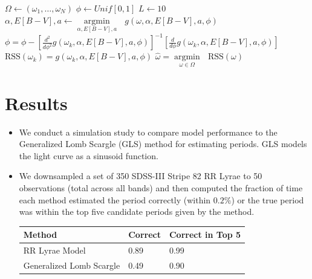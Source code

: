 \documentclass[a0,portrait]{a0poster}
\newcommand{\argmin}[1]{\underset{#1}{\operatorname{argmin}}\text{ }}
\begin{document}
\begin{multicols}{2}
\begin{itemize}
\begin{algorithmic}[1]
  \State $\Omega \gets (\omega_1,\ldots,\omega_N)$ 
  \State $\phi \gets Unif[0,1]$ 
  \State $L \gets 10$ 
  \State $\alpha,E[B-V],a \gets \argmin{\alpha,E[B-V],a} g(\omega,\alpha,E[B-V],a,\phi)$  
  \State $\phi = \phi - \left[\frac{d^2}{d\phi^2}g(\omega_k,\alpha,E[B-V],a,\phi)\right]^{-1}\left[\frac{d}{d\phi}g(\omega_k,\alpha,E[B-V],a,\phi)\right] $ 
  \EndFor
  \State $\text{RSS}(\omega_k) = g(\omega_k,\alpha,E[B-V],a,\phi)$
  \EndFor
  \State $\widehat{\omega} = \argmin{\omega \in \Omega} \text{RSS}(\omega)$
\end{algorithmic}

\end{itemize}


\section*{Results}

\begin{itemize}

\item We conduct a simulation study to compare model performance to the Generalized Lomb Scargle (GLS) method for estimating periods. GLS models the light curve as a sinusoid function.

\item We downsampled a set of 350 SDSS-III Stripe 82 RR Lyrae to 50 observations (total across all bands) and then computed the fraction of time each method estimated the period correctly (within $0.2\%$) or the true period was within the top five candidate periods given by the method.

\begin{center}
\begin{tabular}{l l l}
\toprule
\textbf{Method} & \textbf{Correct} & \textbf{Correct in Top 5}\\
\midrule
RR Lyrae Model  & 0.89 & 0.99 \\
Generalized Lomb Scargle & 0.49  &  0.90\\
\bottomrule
\end{tabular}
\end{center}


\end{itemize}
\end{multicols}
\end{document}
